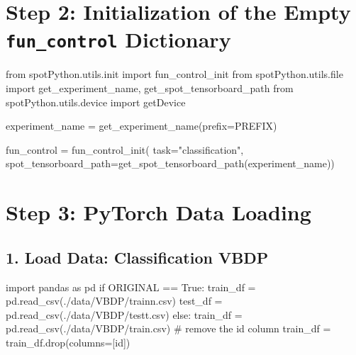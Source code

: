 \documentclass[
  letterpaper,
  DIV=11,
  numbers=noendperiod]{scrreprt}
\newenvironment{Shaded}{\begin{snugshade}}{\end{snugshade}}
\newcommand{\BuiltInTok}[1]{\textcolor[rgb]{0.00,0.23,0.31}{#1}}
\newcommand{\CommentTok}[1]{\textcolor[rgb]{0.37,0.37,0.37}{#1}}
\newcommand{\ControlFlowTok}[1]{\textcolor[rgb]{0.00,0.23,0.31}{#1}}
\newcommand{\ImportTok}[1]{\textcolor[rgb]{0.00,0.46,0.62}{#1}}
\newcommand{\NormalTok}[1]{\textcolor[rgb]{0.00,0.23,0.31}{#1}}
\newcommand{\OperatorTok}[1]{\textcolor[rgb]{0.37,0.37,0.37}{#1}}
\newcommand{\StringTok}[1]{\textcolor[rgb]{0.13,0.47,0.30}{#1}}
\newcommand{\VariableTok}[1]{\textcolor[rgb]{0.07,0.07,0.07}{#1}}
\begin{document}
\hypertarget{step-2-initialization-of-the-empty-fun_control-dictionary-2}{%
\section{\texorpdfstring{Step 2: Initialization of the Empty
\texttt{fun\_control}
Dictionary}{Step 2: Initialization of the Empty fun\_control Dictionary}}\label{step-2-initialization-of-the-empty-fun_control-dictionary-2}}

\begin{Shaded}
\begin{Highlighting}[]
\ImportTok{from}\NormalTok{ spotPython.utils.init }\ImportTok{import}\NormalTok{ fun\_control\_init}
\ImportTok{from}\NormalTok{ spotPython.utils.}\BuiltInTok{file} \ImportTok{import}\NormalTok{ get\_experiment\_name, get\_spot\_tensorboard\_path}
\ImportTok{from}\NormalTok{ spotPython.utils.device }\ImportTok{import}\NormalTok{ getDevice}

\NormalTok{experiment\_name }\OperatorTok{=}\NormalTok{ get\_experiment\_name(prefix}\OperatorTok{=}\NormalTok{PREFIX)}

\NormalTok{fun\_control }\OperatorTok{=}\NormalTok{ fun\_control\_init(}
\NormalTok{    task}\OperatorTok{=}\StringTok{"classification"}\NormalTok{,}
\NormalTok{    spot\_tensorboard\_path}\OperatorTok{=}\NormalTok{get\_spot\_tensorboard\_path(experiment\_name))}
\end{Highlighting}
\end{Shaded}

\hypertarget{sec-data-loading-17}{%
\section{Step 3: PyTorch Data Loading}\label{sec-data-loading-17}}

\hypertarget{load-data-classification-vbdp-1}{%
\subsection{1. Load Data: Classification
VBDP}\label{load-data-classification-vbdp-1}}

\begin{Shaded}
\begin{Highlighting}[]
\ImportTok{import}\NormalTok{ pandas }\ImportTok{as}\NormalTok{ pd}
\ControlFlowTok{if}\NormalTok{ ORIGINAL }\OperatorTok{==} \VariableTok{True}\NormalTok{:}
\NormalTok{    train\_df }\OperatorTok{=}\NormalTok{ pd.read\_csv(}\StringTok{\textquotesingle{}./data/VBDP/trainn.csv\textquotesingle{}}\NormalTok{)}
\NormalTok{    test\_df }\OperatorTok{=}\NormalTok{ pd.read\_csv(}\StringTok{\textquotesingle{}./data/VBDP/testt.csv\textquotesingle{}}\NormalTok{)}
\ControlFlowTok{else}\NormalTok{:}
\NormalTok{    train\_df }\OperatorTok{=}\NormalTok{ pd.read\_csv(}\StringTok{\textquotesingle{}./data/VBDP/train.csv\textquotesingle{}}\NormalTok{)}
    \CommentTok{\# remove the id column}
\NormalTok{    train\_df }\OperatorTok{=}\NormalTok{ train\_df.drop(columns}\OperatorTok{=}\NormalTok{[}\StringTok{\textquotesingle{}id\textquotesingle{}}\NormalTok{])}
\end{Highlighting}
\end{Shaded}
\end{document}
